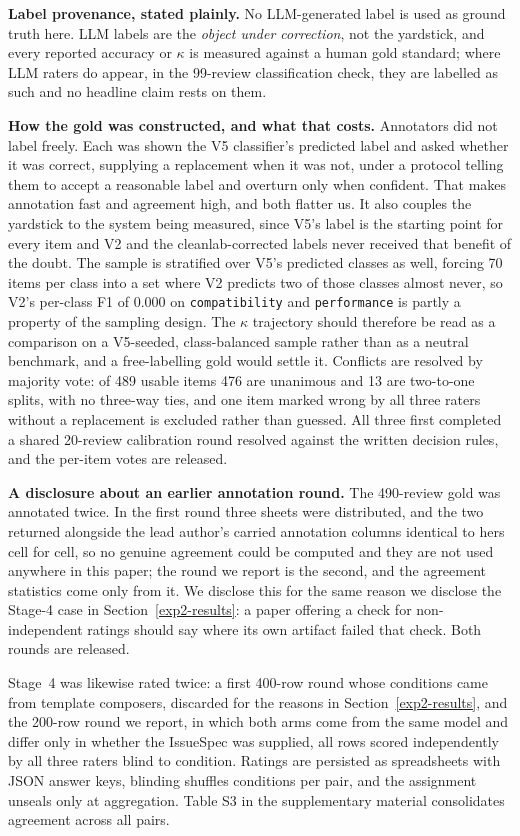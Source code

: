 \documentclass[preprint,12pt]{elsarticle}
\begin{document}
\textbf{Label provenance, stated plainly.} No LLM-generated label is used as ground truth here.
LLM labels are the \emph{object under correction}, not the yardstick, and every reported accuracy
or $\kappa$ is measured against a human gold standard; where LLM raters do appear, in the
99-review classification check, they are labelled as such and no headline claim rests on them.

\textbf{How the gold was constructed, and what that costs.} Annotators did not label freely.
Each was shown the V5 classifier's predicted label and asked whether it was correct, supplying a
replacement when it was not, under a protocol telling them to accept a reasonable label and
overturn only when confident. That makes annotation fast and agreement high, and both flatter us.
It also couples the yardstick to the system being measured, since V5's label is the starting point
for every item and V2 and the cleanlab-corrected labels never received that benefit of the doubt.
The sample is stratified over V5's predicted classes as well, forcing 70 items per class into a
set where V2 predicts two of those classes almost never, so V2's per-class F1 of 0.000 on
\texttt{compatibility} and \texttt{performance} is partly a property of the sampling design. The
$\kappa$ trajectory should therefore be read as a comparison on a V5-seeded, class-balanced sample
rather than as a neutral benchmark, and a free-labelling gold would settle it. Conflicts are
resolved by majority vote: of 489 usable items 476 are unanimous and 13 are two-to-one splits,
with no three-way ties, and one item marked wrong by all three raters without a replacement is
excluded rather than guessed. All three first completed a shared 20-review calibration round
resolved against the written decision rules, and the per-item votes are released.

\textbf{A disclosure about an earlier annotation round.} The 490-review gold was annotated
twice. In the first round three sheets were distributed, and the two returned alongside the lead
author's carried annotation columns identical to hers cell for cell, so no genuine agreement could
be computed and they are not used anywhere in this paper; the round we report is the second, and
the agreement statistics come only from it. We disclose this for the same reason we disclose the
Stage-4 case in Section~\ref{exp2-results}: a paper offering a check for non-independent ratings
should say where its own artifact failed that check. Both rounds are released.

Stage~4 was likewise rated twice: a first 400-row round whose conditions came from template
composers, discarded for the reasons in Section~\ref{exp2-results}, and the 200-row round we
report, in which both arms come from the same model and differ only in whether the IssueSpec was
supplied, all rows scored independently by all three raters blind to condition. Ratings are
persisted as spreadsheets with JSON answer keys, blinding shuffles conditions per pair, and the
assignment unseals only at aggregation. Table S3 in the supplementary material consolidates agreement
across all pairs.
\end{document}
